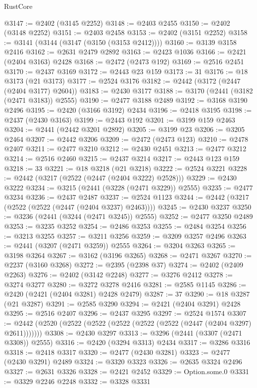 \begin{lexlean}{RustCore}
\begin{coremodule}
@3147 := @2402 (@3145 @2252)
@3148 := @2403 @2455
@3150 := @2402 (@3148 @2252)
@3151 := @2403 @2458
@3153 := @2402 (@3151 @2252)
@3158 := @3141 (@3144 (@3147 (@3150 (@3153 @2412))))
@3160 := @3139 @3158 @2416
@3162 := @2631 @2479 @2892
@3163 := @2423 @1036
@3166 := @2421 (@2404 @3163) @2428
@3168 := @2472 (@2473 @192)
@3169 := @2516 @2451
@3170 := @2437 @3169
@3172 := @2443 @23 @159
@3173 := 31
@3176 := @18 @3173 (@21 @3173)
@3177 := @2524 @3176
@3182 := @2442 (@3172 (@2447 (@2404 @3177) @2604))
@3183 := @2430 @3177
@3188 := @3170 (@2441 (@3182 (@2471 @3183)) @2555)
@3190 := @2477 @3188 @2489
@3192 := @3168 @3190 @2496
@3195 := @2420 (@3166 @3192) @2434
@3196 := @2418 @3195
@3198 := @2437 (@2430 @3163)
@3199 := @2443 @192
@3201 := @3199 @159 @2463
@3204 := @2441 (@2442 @3201 @2892)
@3205 := @3199 @23
@3206 := @3205 @2464
@3207 := @2442 @3206
@3209 := @2472 (@2473 @123)
@3210 := @2478 @2407
@3211 := @2477 @3210
@3212 := @2430 @2451
@3213 := @2477 @3212
@3214 := @2516 @2460
@3215 := @2437 @3214
@3217 := @2443 @123 @159
@3218 := 33
@3221 := @18 @3218 (@21 @3218)
@3222 := @2524 @3221
@3228 := @2442 (@3217 (@2522 (@2447 (@2404 @3222) @2528)))
@3229 := @2430 @3222
@3234 := @3215 (@2441 (@3228 (@2471 @3229)) @2555)
@3235 := @2477 @3234
@3236 := @2437 @2487
@3237 := @2524 @1123
@3244 := @2442 (@3217 (@2522 (@2522 (@2447 (@2404 @3237) @2463))))
@3245 := @2430 @3237
@3250 := @3236 (@2441 (@3244 (@2471 @3245)) @2555)
@3252 := @2477 @3250 @2489
@3253 := @3235 @3252
@3254 := @2486 @3253
@3255 := @2484 @3254
@3256 := @3213 @3255
@3257 := @3211 @3256
@3259 := @3209 @3257 @2496
@3263 := @2441 (@3207 (@2471 @3259)) @2555
@3264 := @3204 @3263
@3265 := @3198 @3264
@3267 := @3162 (@3196 @3265)
@3268 := @2471 @3267
@3270 := @2237 (@3160 @3268)
@3272 := @2395 (@2398 @37)
@3274 := @2402 (@2409 @2263)
@3276 := @2402 (@3142 @2248)
@3277 := @3276 @2412
@3278 := @3274 @3277
@3280 := @3272 @3278 @2416
@3281 := @2585 @1145
@3286 := @2420 (@2421 (@2404 @3281) @2428 @2479)
@3287 := 37
@3290 := @18 @3287 (@21 @3287)
@3291 := @2585 @3290
@3294 := @2421 (@2404 @3291) @2428
@3295 := @2516 @2407
@3296 := @2437 @3295
@3297 := @2524 @1574
@3307 := @2442 (@2520 (@2522 (@2522 (@2522 (@2522 (@2522 (@2447 (@2404 @3297) @2611)))))))
@3308 := @2430 @3297
@3313 := @3296 (@2441 (@3307 (@2471 @3308)) @2555)
@3316 := @2420 (@3294 @3313) @2434
@3317 := @3286 @3316
@3318 := @2418 @3317
@3320 := @2477 (@2430 @3281)
@3323 := @2477 (@2430 @3291) @2489
@3324 := @3320 @3323
@3326 := @2635 @3324 @2496
@3327 := @2631 @3326
@3328 := @2421 @2452
@3329 := Option.some.{0}
@3331 := @3329 @2246 @2248
@3332 := @3328 @3331

\end{coremodule}
\end{lexlean}
